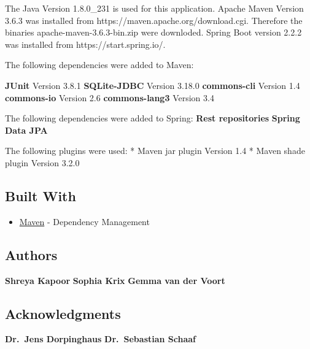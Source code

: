 The Java Version 1.8.0\_231 is used for this application. Apache Maven
Version 3.6.3 was installed from https://maven.apache.org/download.cgi.
Therefore the binaries apache-maven-3.6.3-bin.zip were downloded. Spring
Boot version 2.2.2 was installed from https://start.spring.io/.

The following dependencies were added to Maven:

\textbf{JUnit} Version 3.8.1 \textbf{SQLite-JDBC} Version 3.18.0
\textbf{commons-cli} Version 1.4 \textbf{commons-io} Version 2.6
\textbf{commons-lang3} Version 3.4

The following dependencies were added to Spring: \textbf{Rest
repositories} \textbf{Spring Data JPA}

The following plugins were used: * Maven jar plugin Version 1.4 * Maven
shade plugin Version 3.2.0

\hypertarget{built-with}{%
\subsection{Built With}\label{built-with}}

\begin{itemize}
\tightlist
\item
  \href{https://maven.apache.org/}{Maven} - Dependency Management
\end{itemize}

\hypertarget{authors}{%
\subsection{Authors}\label{authors}}

\textbf{Shreya Kapoor} \textbf{Sophia Krix} \textbf{Gemma van der Voort}

\hypertarget{acknowledgments}{%
\subsection{Acknowledgments}\label{acknowledgments}}

\textbf{Dr.~Jens Dorpinghaus} \textbf{Dr.~Sebastian Schaaf}
